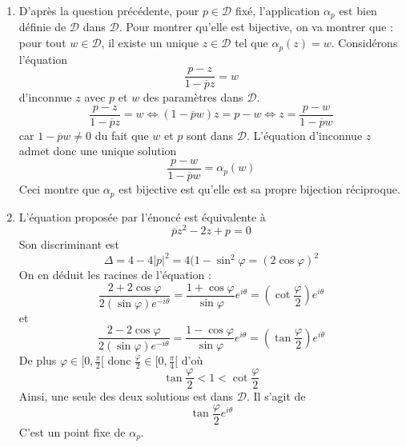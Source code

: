 \begin{enumerate}
\item D'après la question précédente, pour $p\in \mathcal D$ fixé, l'application $\alpha_p$ est bien définie de $\mathcal D$ dans $\mathcal D$. Pour montrer qu'elle est bijective, on va montrer que :\newline
 pour tout $w\in \mathcal D$, il existe un unique $z\in \mathcal D$ tel que $\alpha_p(z)=w$.\newline
Considérons l'équation
\begin{displaymath}
 \dfrac{p-z}{1-\overline{p}z} = w
\end{displaymath}
d'inconnue $z$ avec $p$ et $w$ des paramètres dans $\mathcal D$.
\begin{displaymath}
 \dfrac{p-z}{1-\overline{p}z} = w 
\Leftrightarrow (1-\overline{p}w)z= p-w
\Leftrightarrow z= \dfrac{p-w}{1-\overline{p}w} 
\end{displaymath}
car $1-\overline{p}w\neq 0$ du fait que $w$ et $p$ sont dans $\mathcal D$.\newline
L'équation d'inconnue $z$ admet donc une unique solution
\begin{displaymath}
  \dfrac{p-w}{1-\overline{p}w} = \alpha_p(w)
\end{displaymath}
Ceci montre que $\alpha_p$ est bijective est qu'elle est sa propre bijection réciproque.
\item L'équation proposée par l'énoncé est équivalente à
\begin{displaymath}
 \overline{p}z^2 -2z +p =0
\end{displaymath}
Son discriminant est 
\begin{displaymath}
 \Delta = 4-4|p|^2=4(1-\sin^2 \varphi = (2\cos \varphi)^2
\end{displaymath}
On en déduit les racines de l'équation :
\begin{displaymath}
 \dfrac{2+2\cos \varphi}{2(\sin\varphi) e^{-i\theta}}
=\dfrac{1+\cos \varphi}{\sin\varphi}e^{i\theta}=(\cot\dfrac{\varphi}{2})e^{i\theta}
\end{displaymath}
et
\begin{displaymath}
 \dfrac{2-2\cos \varphi}{2(\sin\varphi) e^{-i\theta}}
=\dfrac{1-\cos \varphi}{\sin\varphi}e^{i\theta}=(\tan\dfrac{\varphi}{2})e^{i\theta}
\end{displaymath}
De plus $\varphi \in [0,\frac{\pi}{2}[$ donc $\frac{\varphi}{2} \in [0,\frac{\pi}{4}[$ d'où
\begin{displaymath}
 \tan\dfrac{\varphi}{2} < 1 < \cot \dfrac{\varphi}{2}
\end{displaymath}
Ainsi, une seule des deux solutions est dans $\mathcal D$. Il s'agit de
\begin{displaymath}
 \tan\dfrac{\varphi}{2}e^{i\theta}
\end{displaymath}
C'est un point fixe de $\alpha_p$.
\end{enumerate}
